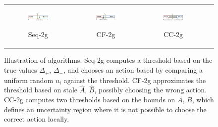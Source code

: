 \documentclass{article} %
\newcommand{\hogwild}{CF-2g}
\newcommand{\occ}{CC-2g}
\newcommand{\seqalg}{Seq-2g}
\begin{document}
\begin{figure}[h]
\begin{multicols}{2}
\begin{minipage}{0.49\textwidth}
    \end{minipage}



  \end{multicols}
  \label{fig:submax}
\end{figure}



\begin{figure}[ht]
  \centering
  \begin{tabular}{cccc}
    \begin{subfigure}[h]{0.30\textwidth}
      \centering
      \includegraphics[width=130pt]{images/probvec_seq.pdf}
      \label{fig:probvecseq}
      \caption{\footnotesize\seqalg{}}
    \end{subfigure} &
    \begin{subfigure}[h]{0.30\textwidth}
      \centering
      \includegraphics[width=130pt]{images/probvec_CF.pdf}
      \label{fig:probveccf}
      \caption{\footnotesize\hogwild{}}
    \end{subfigure} &
    \begin{subfigure}[h]{0.30\textwidth}
      \centering
      \includegraphics[width=130pt]{images/probvec_CC.pdf}
      \label{fig:probveccc}
      \caption{\footnotesize\occ{}}
    \end{subfigure} 
  \end{tabular}
  \caption{\footnotesize Illustration of algorithms.
  \seqalg{} computes a threshold based on the true values $\Delta_+$, $\Delta_-$, and chooses an action based by comparing a uniform random $u_i$ against the threshold.
  \hogwild{} approximates the threshold based on stale $\hat{A}$, $\hat{B}$, possibly choosing the wrong action.
  \occ{} computes two thresholds based on the bounds on $A$, $B$, which defines an uncertainty region where it is not possible to choose the correct action locally.
  }
\end{figure}
\end{document}
